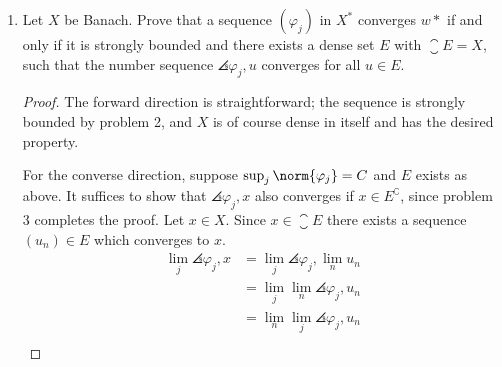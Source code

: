 \documentclass[12pt,letterpaper]{article}
\renewcommand{\phi}{\varphi}
\begin{document}
\begin{enumerate}
\begin{proof}
We can of course define a functional $\phi(x)=\lim_j\angles{\phi_j,x}$ and note that it is linear, but we need to show that this $\phi$ is bounded. Since the sequence $\angles{\phi_j,x}$ is convergent and thus bounded, then by problem 2 the set $\{\phi_j\}_j$ is bounded in $X^*$, call this bound $M$. Thus for all $x$ with $\norm{x}\leq1$,
\begin{align*}
|\angles{\phi, x}| &= |\lim_j\langle\phi_j, x\rangle| \\
&= \lim_j|\langle\phi_j, x\rangle| \\
\leq M
\end{align*}
and we're done. 
\end{proof}

(b) Formulate the analogous statement for the $w$-convergence for a sequence $(x_n)\in X$. Try to extend your proof to this situation. when does the proof collapse?

\textbf{Question} Let $X$ be a Banach space and $(x_n)$ be a sequence in $X$. Suppose that $\angles{\phi , x_n}$ converges for any $\phi \in X^*$. Does there exist $x \in X$ such that $x_n \xto{w} x$?

\answer We can follow the strategy from (a) and define a \emph{functional} $\hat{x}\in X^{**}$ so that $\angles{\phi , x_n}\to \angles{\phi , \hat{x}}$, but we are only guaranteed that a corresponding $x\in X$ exists exactly when $X$ is reflexive. \qed

\item Let $X$ be Banach. Prove that a sequence $(\phi_j)$ in $X^*$ converges $w*$ if and only if it is strongly bounded and there exists a dense set $E$ with $\closure{E}=X$, such that the number sequence $\angles{\phi_j,u}$ converges for all $u\in E$. 

\begin{proof}
The forward direction is straightforward; the sequence is strongly bounded by problem 2, and $X$ is of course dense in itself and has the desired property. 

For the converse direction, suppose $\sup_j\norm{\phi_j}=C$ and $E$ exists as above. It suffices to show that $\angles{\phi_j,x}$ also converges if $x\in E^\complement$, since problem 3 completes the proof. Let $x\in X$. Since $x\in \closure{E}$ there exists a sequence $(u_n)\in E$ which converges to $x$. 
\begin{align*}
\lim_j\angles{\phi_j,x} &=\lim_j\angles{\phi_j,\lim_n u_n} \\
&=\lim_j\lim_n\angles{\phi_j, u_n} \\
&=\lim_n\lim_j\angles{\phi_j, u_n} \\
\end{align*}


\end{proof}
\end{enumerate}
\end{document}
